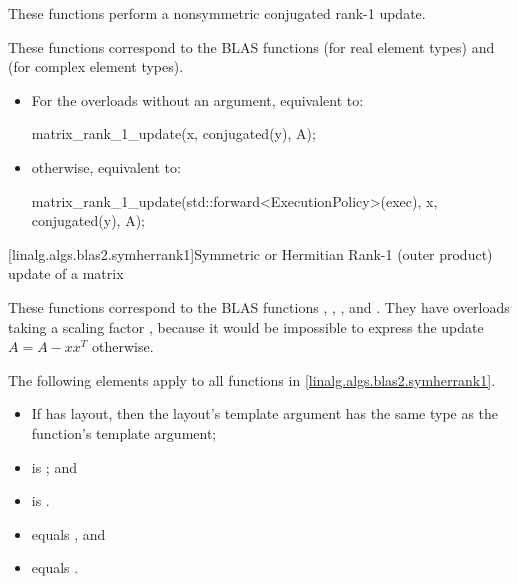 \begin{itemdescr}
\pnum
These functions perform a nonsymmetric conjugated rank-1 update.
\begin{note}
These functions correspond to the BLAS functions
 (for real element types) and
 (for complex element types)\supercite{blas2}.
\end{note}

\pnum
\effects
\begin{itemize}
\item
For the overloads without an  argument,
equivalent to:
\begin{codeblock}
matrix_rank_1_update(x, conjugated(y), A);
\end{codeblock}
\item
otherwise, equivalent to:
\begin{codeblock}
matrix_rank_1_update(std::forward<ExecutionPolicy>(exec), x, conjugated(y), A);
\end{codeblock}
\end{itemize}
\end{itemdescr}

[linalg.algs.blas2.symherrank1]{Symmetric or Hermitian Rank-1 (outer product) update of a matrix}

\pnum
\begin{note}
These functions correspond to the BLAS functions
, , , and \supercite{blas2}.
They have overloads taking a scaling factor ,
because it would be impossible to express the update
$A = A - x x^T$ otherwise.
\end{note}

\pnum
The following elements apply to all functions in \ref{linalg.algs.blas2.symherrank1}.

\pnum
\mandates
\begin{itemize}
\item
If  has  layout,
then the layout's  template argument has
the same type as the function's  template argument;
\item
{}
is ; and
\item
{}
is .
\end{itemize}

\pnum
\expects
\begin{itemize}
\item
{} equals , and
\item
{} equals .
\end{itemize}

